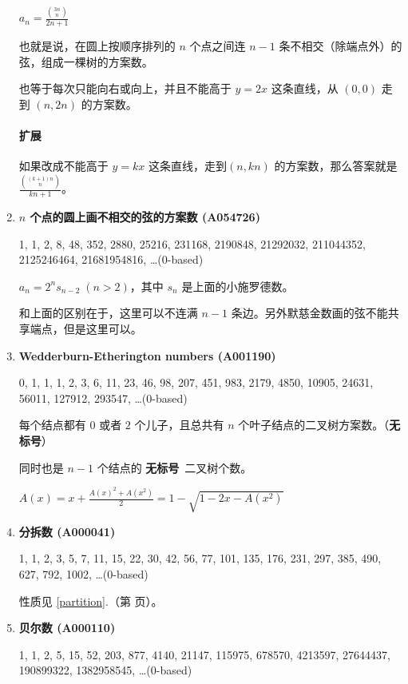 \documentclass[a4paper, twoside]{article}
\newcommand\detailedref[1]{\ref{#1}.\nameref{#1}（第 \pageref{#1} 页）}
\begin{document}
\begin{enumerate}
        $ a_n = \frac {\binom{3n}{n}}{2n + 1} $

        也就是说，在圆上按顺序排列的 $n$ 个点之间连 $n - 1$ 条不相交（除端点外）的弦，组成一棵树的方案数。

        也等于每次只能向右或向上，并且不能高于 $y = 2x$ 这条直线，从 $(0, 0)$ 走到 $(n, 2n)$ 的方案数。

        \paragraph{扩展} 如果改成不能高于 $y = kx$ 这条直线，走到$(n, kn)$ 的方案数，那么答案就是$ \frac {\binom{(k+1)n}{n}} {kn + 1} $。

        \item \textbf{$n$ 个点的圆上画不相交的弦的方案数 (A054726)}
        \label{A054726}

        1, 1, 2, 8, 48, 352, 2880, 25216, 231168, 2190848, 21292032, 211044352, 2125246464, 21681954816, \dots \;(0-based)

        $ a_n = 2^n s_{n - 2} \; (n > 2) $，其中 $s_n$ 是上面的小施罗德数。

        和上面的区别在于，这里可以不连满 $n-1$ 条边。另外默慈金数画的弦不能共享端点，但是这里可以。

        \item \textbf{Wedderburn-Etherington numbers (A001190)}

        0, 1, 1, 1, 2, 3, 6, 11, 23, 46, 98, 207, 451, 983, 2179, 4850, 10905, 24631, 56011, 127912, 293547, \dots \;(0-based)

        每个结点都有 $0$ 或者 $2$ 个儿子，且总共有 $n$ 个叶子结点的二叉树方案数。（\textbf{无标号}）

        同时也是 $n-1$ 个结点的 \textbf{无标号}\ 二叉树个数。

        $ A(x) = x + \frac {A(x) ^ 2 + A(x ^ 2)} 2 = 1 - \sqrt{1 - 2x - A(x ^ 2)} $

        \item \textbf{分拆数 (A000041)}

        1, 1, 2, 3, 5, 7, 11, 15, 22, 30, 42, 56, 77, 101, 135, 176, 231, 297, 385, 490, 627, 792, 1002, \dots \;(0-based)

        性质见 \detailedref{partition}。

        \item \textbf{贝尔数 (A000110)}

        1, 1, 2, 5, 15, 52, 203, 877, 4140, 21147, 115975, 678570, 4213597, 27644437, 190899322, 1382958545, \dots \;(0-based)


\end{enumerate}
\end{document}

